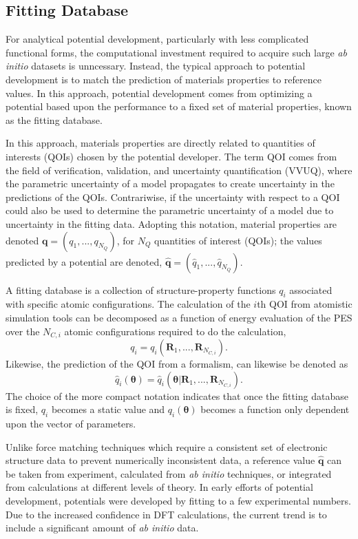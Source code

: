 \subsection{Fitting Database}

For analytical potential development, particularly with less complicated functional forms, the computational investment required to acquire such large \emph{ab initio} datasets is unncessary.  Instead, the typical approach to potential development is to match the prediction of materials properties to reference values.  In this approach,  potential development comes from optimizing a potential based upon the performance to a fixed set of material properties, known as the fitting database.

In this approach, materials properties are directly related to quantities of interests (QOIs) chosen by the potential developer.  The term QOI comes from the field of verification, validation, and uncertainty quantification (VVUQ), where the parametric uncertainty of a model propagates to create uncertainty in the predictions of the QOIs.  Contrariwise, if the uncertainty with respect to a QOI could also be used to determine the parametric uncertainty of a model due to uncertainty in the fitting data.   Adopting this notation, material properties are denoted  $\bm{q} = ( q_{1},...,q_{N_Q} )$, for $N_Q$ quantities of interest (QOIs); the values predicted by a potential are denoted, $\hat{\bm{q}}= (\hat{q}_{1},...,\hat{q}_{N_Q})$.

A fitting database is a collection of structure-property functions $q_i$ associated with specific atomic configurations.	The calculation of the $i$th QOI from atomistic simulation tools can be decomposed as a function of energy evaluation of the PES over the $N_{C,i}$ atomic configurations required to do the calculation,
	\begin{equation}
		q_i = q_i(\bm{R}_1,...,\bm{R}_{N_{C,i}}).
	\end{equation}
Likewise, the prediction of the QOI from a formalism, can likewise be denoted as
	\begin{equation}
		\hat{q}_i(\bm{\theta})
		=
		\hat{q}_i(\bm{\theta}|\bm{R}_1,...,\bm{R}_{N_{C,i}}).
	\end{equation}
The choice of the more compact notation indicates that once the fitting database is fixed, $q_i$ becomes a static value and $\hat{q_i}(\bm{\theta})$ becomes a function only dependent upon the vector of parameters.

Unlike force matching techniques which require a consistent set of electronic structure data to prevent numerically inconsistent data\cite{behler2016_ml_pot}, a reference value $\hat{\bm{q}}$ can be taken from experiment, calculated from \emph{ab initio} techniques, or integrated from calculations at different levels of theory.  In early efforts of potential development, potentials were developed by fitting to a few experimental numbers.	Due to the increased confidence in DFT calculations, the current trend is to include a significant amount of \emph{ab initio} data.

